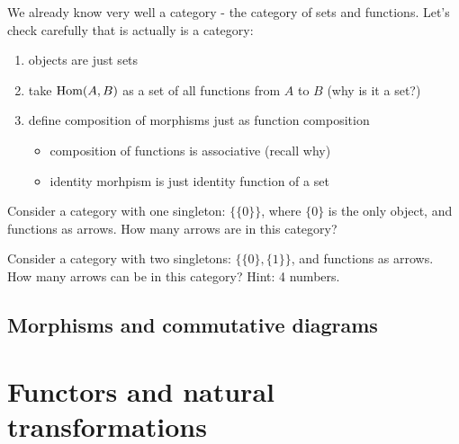 \begin{example}
  We already know very well a category - the category of sets and functions. Let's check carefully that is actually is a category:
  \begin{enumerate}
    \item objects are just sets
    \item take $\text{Hom}(A,B)$ as a set of all functions from $A$ to $B$ (why is it a set?)
    \item define composition of morphisms just as function composition
      \begin{itemize}
        \item composition of functions is associative (recall why)
        \item identity morhpism is just identity function of a set
      \end{itemize}
  \end{enumerate}
\end{example}

\begin{exercise}
  Consider a category with one singleton: $\{\{0\}\}$, where $\{0\}$ is the only object, and functions as arrows. How many arrows are in this category?
\end{exercise}

\begin{exercise}
  Consider a category with two singletons: $\{\{0\}, \{1\}\}$, and functions as arrows. How many arrows can be in this category? Hint: 4 numbers.
\end{exercise}

\subsection{Morphisms and commutative diagrams}

\section{Functors and natural transformations}
